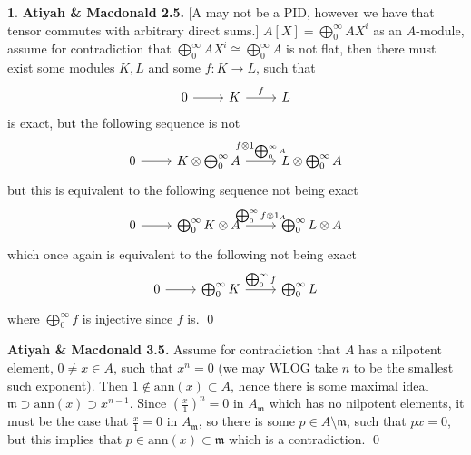 \documentclass[11pt]{article}
\theoremstyle{definition}
\newtheorem{pb}{}
\begin{document}
\begin{pb}
        \color{blue} \textbf{Atiyah \& Macdonald 2.5.} [A may not be a PID, however we have that tensor commutes with arbitrary direct sums.] \(A[X] = \bigoplus_0^\infty AX^i\) as an \(A\)-module, assume for contradiction that \(\bigoplus_0^\infty AX^i \cong \bigoplus_0^\infty A\) is not flat, then there must exist some modules \(K,L\) and some \(f: K \to L\), such that
        \begin{equation*}
            \begin{tikzcd}
                0 \arrow[r,"{}"] &K \arrow[r,"{f}"] &L
            \end{tikzcd}
        \end{equation*}
        is exact, but the following sequence is not
        \begin{equation*}
            \begin{tikzcd}
                0 \arrow[r,"{}"] &K \otimes \bigoplus_0^\infty A \arrow[r,"{f \otimes 1_{\bigoplus_0^\infty A}}"] &L \otimes \bigoplus_0^\infty A
            \end{tikzcd}
        \end{equation*}
        but this is equivalent to the following sequence not being exact
        \begin{equation*}
            \begin{tikzcd}
                0 \arrow[r,"{}"]& \bigoplus_0^\infty K\otimes A \arrow[r,"{\bigoplus_0^\infty f \otimes 1_A}"] &\bigoplus_0^\infty L\otimes A
            \end{tikzcd}
        \end{equation*}
        which once again is equivalent to the following not being exact
        \begin{equation*}
            \begin{tikzcd}
                0 \arrow[r,"{}"] & \bigoplus_0^\infty K \arrow[r,"{\bigoplus_0^\infty f}"] & \bigoplus_0^\infty L
            \end{tikzcd}
        \end{equation*}
        where \(\bigoplus_0^\infty f\) is injective since \(f\) is. \qed

        \textbf{Atiyah \& Macdonald 3.5.} Assume  for contradiction that \(A\) has a nilpotent element, \(0 \neq x \in A\), such that \(x^n = 0\) (we may WLOG take \(n\) to be the smallest such exponent). Then \(1 \not \in \text{ann}(x) \subset A\), hence there is some maximal ideal \(\mathfrak{m} \supset \text{ann}(x) \supset x^{n-1}\). Since \(\left(\frac{x}{1}\right)^n = 0\) in \(A_{\mathfrak{m}}\) which has no nilpotent elements, it must be the case that \(\frac{x}{1} = 0\) in \(A_{\mathfrak{m}}\), so there is some \(p \in A \setminus\mathfrak{m}\), such that \(px = 0\), but this implies that \(p \in \text{ann}(x) \subset \mathfrak{m}\) which is a contradiction. \qed


\end{pb}
\end{document}
